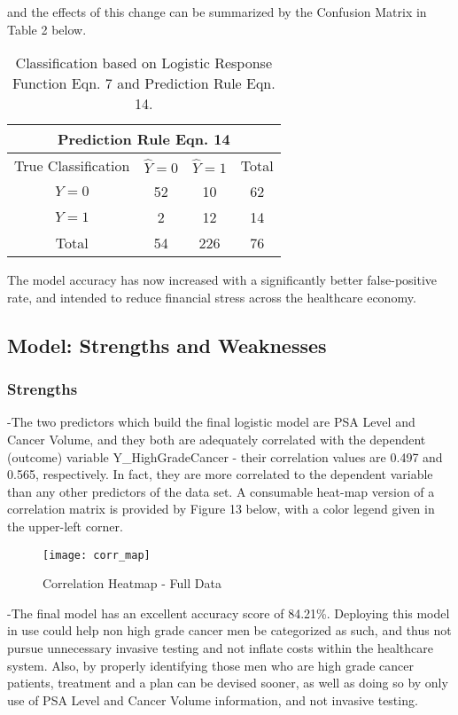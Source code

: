 and the effects of this change can be summarized by the Confusion Matrix in Table 2 below.

\begin{table}[H]
	\centering
	\begin{tabular}{ |c||c|c||c| }
 	\hline
 	\multicolumn{4}{|c|}{Prediction Rule Eqn. 14} \\
 	\hline\hline
 	True Classification&\(\hat{Y}=0\)&\(\hat{Y}=1\)&Total\\
 	\hline
 	\(Y=0\)&52&10&62\\
 	\(Y=1\)&2&12&14\\
 	\hline\hline
 	Total&54&226&76\\
 	\hline
	\end{tabular}
 	\caption{Classification based on Logistic Response Function Eqn. 7 and Prediction Rule Eqn. 14.}
\end{table}

The model accuracy has now increased with a significantly better false-positive rate, and intended to reduce financial stress across the healthcare economy.


\subsection{Model: Strengths and Weaknesses}
\subsubsection{Strengths}
-The two predictors which build the final logistic model are PSA Level and Cancer Volume, and they both are adequately correlated with the dependent (outcome) variable Y\_HighGradeCancer - their correlation values are 0.497 and 0.565, respectively. In fact, they are more correlated to the dependent variable than any other predictors of the data set. A consumable heat-map version of a correlation matrix is provided by Figure 13 below, with a color legend given in the upper-left corner.

\begin{figure}[H]
	\centering
	\texttt{[image: corr\_map]}
	\caption{Correlation Heatmap - Full Data}
\end{figure}

-The final model has an excellent accuracy score of 84.21\%. Deploying this model in use could help non high grade cancer men be categorized as such, and thus not pursue unnecessary invasive testing and not inflate costs within the healthcare system. Also, by properly identifying those men who are high grade cancer patients, treatment and a plan can be devised sooner, as well as doing so by only use of PSA Level and Cancer Volume information, and not invasive testing. \\ 

